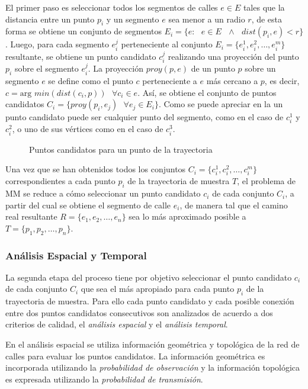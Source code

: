 El primer paso es seleccionar todos los segmentos de calles $e \in E$ tales que la distancia entre un punto $p_i$ y un segmento $e$ sea menor a un radio $r$, de esta forma se obtiene un conjunto de segmentos $E_i = \{ e : \text{ } e \in E \text{ } \wedge \text{ } dist(p_i, e) < r \}$. Luego, para cada segmento $e_{i}^{j}$ perteneciente al conjunto $E_i = \{e_{i}^{1}, e_{i}^{2}, \dots, e_{i}^{m}\}$ resultante, se obtiene un punto candidato $c_{i}^{j}$ realizando una proyección del punto $p_i$ sobre el segmento $e_{i}^{j}$. La proyección $proy(p, e)$ de un punto $p$ sobre un segmento $e$ se define como el punto $c$ perteneciente a $e$ más cercano a $p$, es decir, $c = \text{arg } min(dist(c_i, p)) \text{ } \forall c_i \in e$. Así, se obtiene el conjunto de puntos candidatos $C_i = \{ proy(p_i, e_j) \text{ } \forall e_j \in E_i \}$. Como se puede apreciar en la  un punto candidato puede ser cualquier punto del segmento, como en el caso de $c_{i}^{1}$ y $c_{i}^{2}$, o uno de sus vértices como en el caso de $c_{i}^{3}$.

\begin{figure}[h*]
	\centering
	
	\caption{\label{fig:puntos_candidatos} Puntos candidatos para un punto de la trayectoria}	
\end{figure}

Una vez que se han obtenidos todos los conjuntos $C_i = \{c_{i}^{1}, c_{i}^{2}, \dots, c_{i}^{m}\}$ correspondientes a cada punto $p_i$ de la trayectoria de muestra $T$, el problema de MM se reduce a cómo seleccionar un punto candidato $c_i$ de cada conjunto $C_i$, a partir del cual se obtiene el segmento de calle $e_i$, de manera tal que el camino real resultante $R = \{ e_1, e_2, \dots, e_n \}$ sea lo más aproximado posible a $T = \{ p_1, p_2, \dots, p_n\}$.

\subsubsection{Análisis Espacial y Temporal}

La segunda etapa del proceso tiene por objetivo seleccionar el punto candidato $c_i$ de cada conjunto $C_i$ que sea el más apropiado para cada punto $p_i$ de la trayectoria de muestra. Para ello cada punto candidato y cada posible conexión entre dos puntos candidatos consecutivos son analizados de acuerdo a dos criterios de calidad, el \emph{análisis espacial} y el \emph{análisis temporal}.

En el análisis espacial se utiliza información geométrica y topológica de la red de calles para evaluar los puntos candidatos. La información geométrica es incorporada utilizando la \emph{probabilidad de observación} y la información topológica es expresada utilizando la \emph{probabilidad de transmisión}.

